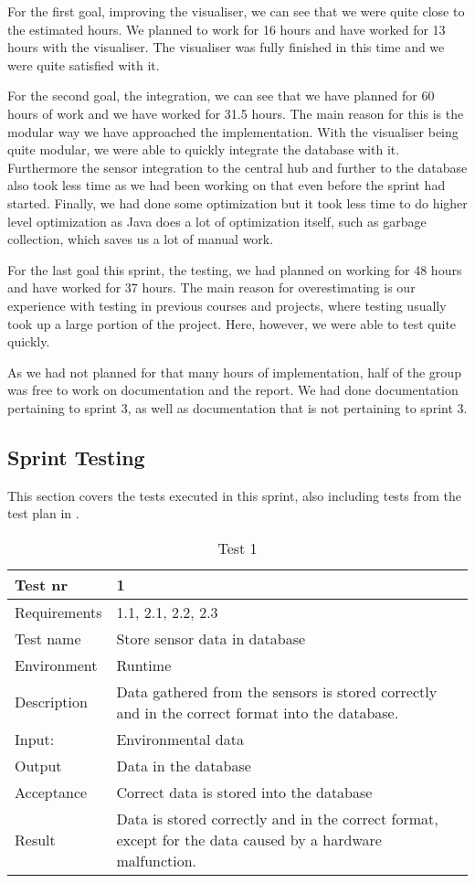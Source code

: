 \documentclass[../document]{subfiles}
\begin{document}
For the first goal, improving the visualiser, we can see that we were quite close to the estimated hours. We planned to work for 16 hours and have worked for 13 hours with the visualiser. The visualiser was fully finished in this time and we were quite satisfied with it.

For the second goal, the integration, we can see that we have planned for 60 hours of work and we have worked for 31.5 hours. The main reason for this is the modular way we have approached the implementation. With the visualiser being quite modular, we were able to quickly integrate the database with it. Furthermore the sensor integration to the central hub and further to the database also took less time as we had been working on that even before the sprint had started. Finally, we had done some optimization but it took less time to do higher level optimization as Java does a lot of optimization itself, such as garbage collection, which saves us a lot of manual work.

For the last goal this sprint, the testing, we had planned on working for 48 hours and have worked for 37 hours. The main reason for overestimating is our experience with testing in previous courses and projects, where testing usually took up a large portion of the project. Here, however, we were able to test quite quickly.

As we had not planned for that many hours of implementation, half of the group was free to work on documentation and the report. We had done documentation pertaining to sprint 3, as well as documentation that is not pertaining to sprint 3.

\subsection{Sprint Testing}
This section covers the tests executed in this sprint, also including tests from the test plan in .

\begin{table}[H]
\caption{Test 1}
\centering
\begin{tabularx}{\textwidth}{|l|X|}
	\hline
	Test nr
	&1
	\\ \hline Requirements
	&1.1, 2.1, 2.2, 2.3
	\\ \hline Test name
	&Store sensor data in database
	\\ \hline Environment
	&Runtime
	\\ \hline Description
	&Data gathered from the sensors is stored correctly and in the correct format into the database.
	\\ \hline Input:
	&Environmental data
	\\ \hline Output
	&Data in the database
	\\ \hline Acceptance
	&Correct data is stored into the database
	\\ \hline Result
	&Data is stored correctly and in the correct format, except for the data caused by a hardware malfunction.
	\\ \hline 
\end{tabularx}
\end{table}
\end{document}
